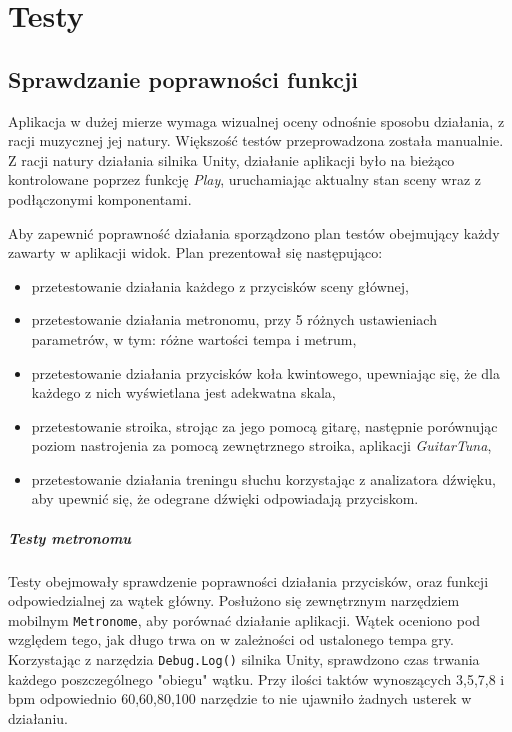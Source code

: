 \chapter{Testy}

\section{Sprawdzanie poprawności funkcji}

Aplikacja w dużej mierze wymaga wizualnej oceny odnośnie sposobu działania, z racji muzycznej jej natury. Większość testów przeprowadzona została manualnie. Z racji natury działania silnika Unity, działanie aplikacji było na bieżąco kontrolowane poprzez funkcję \emph{Play}, uruchamiając aktualny stan sceny wraz z podłączonymi komponentami.

Aby zapewnić poprawność działania sporządzono plan testów obejmujący każdy zawarty w aplikacji widok. Plan prezentował się następująco:
\begin{itemize}
    \item przetestowanie działania każdego z przycisków sceny głównej,
    \item przetestowanie działania metronomu, przy 5 różnych ustawieniach parametrów, w tym: różne wartości tempa i metrum,
    \item przetestowanie działania przycisków koła kwintowego, upewniając się, że dla każdego z nich wyświetlana jest adekwatna skala,
    \item przetestowanie stroika, strojąc za jego pomocą gitarę, następnie porównując poziom nastrojenia za pomocą zewnętrznego stroika, aplikacji \emph{GuitarTuna},
    \item przetestowanie działania treningu słuchu korzystając z analizatora dźwięku, aby upewnić się, że odegrane dźwięki odpowiadają przyciskom.
\end{itemize} 

\paragraph{Testy metronomu}

Testy obejmowały sprawdzenie poprawności działania przycisków, oraz funkcji odpowiedzialnej za wątek główny. Posłużono się zewnętrznym narzędziem mobilnym \texttt{Metronome}, aby porównać działanie aplikacji.  Wątek oceniono pod względem tego, jak długo trwa on w zależności od ustalonego tempa gry. Korzystając z narzędzia \texttt{Debug.Log()} silnika Unity, sprawdzono czas trwania każdego poszczególnego "obiegu" wątku. Przy ilości taktów wynoszących 3,5,7,8 i bpm odpowiednio 60,60,80,100 narzędzie to nie ujawniło żadnych usterek w działaniu.


